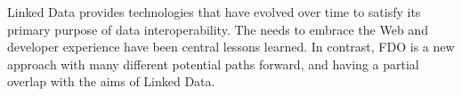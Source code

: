 Linked Data provides technologies that have evolved over time to satisfy its primary purpose of data interoperability. The needs to embrace the Web and developer experience have been central lessons learned.  In contrast, FDO is a new approach with many different potential paths forward, and having a partial overlap with the aims of Linked Data.



